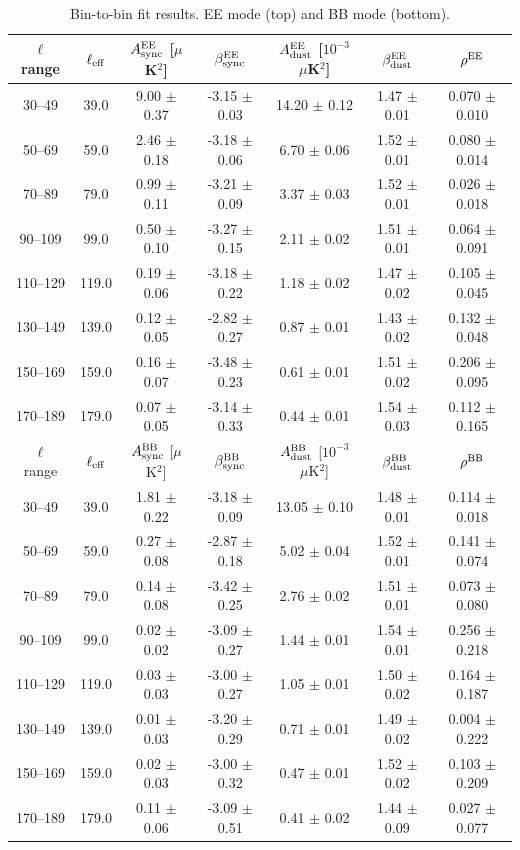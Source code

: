 \begin{table}[htbp]
\centering
\caption{Bin-to-bin fit results. EE mode (top) and BB mode (bottom).}
\label{tab:bin_to_bin_results}
\begin{tabular}{c c c c c c c}
\hline\hline
$\ell$ range & $\ell_{\rm eff}$ & $A^{\rm EE}_{\rm sync}$ [$\mu$K$^2$] & $\beta^{\rm EE}_{\rm sync}$ & $A^{\rm EE}_{\rm dust}$ [$10^{-3}$ $\mu$K$^2$] & $\beta^{\rm EE}_{\rm dust}$ & $\rho^{\rm EE}$ \\
\hline
30--49 & 39.0 & 9.00 $\pm$ 0.37 & -3.15 $\pm$ 0.03 & 14.20 $\pm$ 0.12 & 1.47 $\pm$ 0.01 & 0.070 $\pm$ 0.010 \\
50--69 & 59.0 & 2.46 $\pm$ 0.18 & -3.18 $\pm$ 0.06 & 6.70 $\pm$ 0.06 & 1.52 $\pm$ 0.01 & 0.080 $\pm$ 0.014 \\
70--89 & 79.0 & 0.99 $\pm$ 0.11 & -3.21 $\pm$ 0.09 & 3.37 $\pm$ 0.03 & 1.52 $\pm$ 0.01 & 0.026 $\pm$ 0.018 \\
90--109 & 99.0 & 0.50 $\pm$ 0.10 & -3.27 $\pm$ 0.15 & 2.11 $\pm$ 0.02 & 1.51 $\pm$ 0.01 & 0.064 $\pm$ 0.091 \\
110--129 & 119.0 & 0.19 $\pm$ 0.06 & -3.18 $\pm$ 0.22 & 1.18 $\pm$ 0.02 & 1.47 $\pm$ 0.02 & 0.105 $\pm$ 0.045 \\
130--149 & 139.0 & 0.12 $\pm$ 0.05 & -2.82 $\pm$ 0.27 & 0.87 $\pm$ 0.01 & 1.43 $\pm$ 0.02 & 0.132 $\pm$ 0.048 \\
150--169 & 159.0 & 0.16 $\pm$ 0.07 & -3.48 $\pm$ 0.23 & 0.61 $\pm$ 0.01 & 1.51 $\pm$ 0.02 & 0.206 $\pm$ 0.095 \\
170--189 & 179.0 & 0.07 $\pm$ 0.05 & -3.14 $\pm$ 0.33 & 0.44 $\pm$ 0.01 & 1.54 $\pm$ 0.03 & 0.112 $\pm$ 0.165 \\
\hline
$\ell$ range & $\ell_{\rm eff}$ & $A^{\rm BB}_{\rm sync}$ [$\mu$K$^2$] & $\beta^{\rm BB}_{\rm sync}$ & $A^{\rm BB}_{\rm dust}$ [$10^{-3}$ $\mu$K$^2$] & $\beta^{\rm BB}_{\rm dust}$ & $\rho^{\rm BB}$ \\
\hline
30--49 & 39.0 & 1.81 $\pm$ 0.22 & -3.18 $\pm$ 0.09 & 13.05 $\pm$ 0.10 & 1.48 $\pm$ 0.01 & 0.114 $\pm$ 0.018 \\
50--69 & 59.0 & 0.27 $\pm$ 0.08 & -2.87 $\pm$ 0.18 & 5.02 $\pm$ 0.04 & 1.52 $\pm$ 0.01 & 0.141 $\pm$ 0.074 \\
70--89 & 79.0 & 0.14 $\pm$ 0.08 & -3.42 $\pm$ 0.25 & 2.76 $\pm$ 0.02 & 1.51 $\pm$ 0.01 & 0.073 $\pm$ 0.080 \\
90--109 & 99.0 & 0.02 $\pm$ 0.02 & -3.09 $\pm$ 0.27 & 1.44 $\pm$ 0.01 & 1.54 $\pm$ 0.01 & 0.256 $\pm$ 0.218 \\
110--129 & 119.0 & 0.03 $\pm$ 0.03 & -3.00 $\pm$ 0.27 & 1.05 $\pm$ 0.01 & 1.50 $\pm$ 0.02 & 0.164 $\pm$ 0.187 \\
130--149 & 139.0 & 0.01 $\pm$ 0.03 & -3.20 $\pm$ 0.29 & 0.71 $\pm$ 0.01 & 1.49 $\pm$ 0.02 & 0.004 $\pm$ 0.222 \\
150--169 & 159.0 & 0.02 $\pm$ 0.03 & -3.00 $\pm$ 0.32 & 0.47 $\pm$ 0.01 & 1.52 $\pm$ 0.02 & 0.103 $\pm$ 0.209 \\
170--189 & 179.0 & 0.11 $\pm$ 0.06 & -3.09 $\pm$ 0.51 & 0.41 $\pm$ 0.02 & 1.44 $\pm$ 0.09 & 0.027 $\pm$ 0.077 \\
\hline\hline
\end{tabular}
\end{table}

